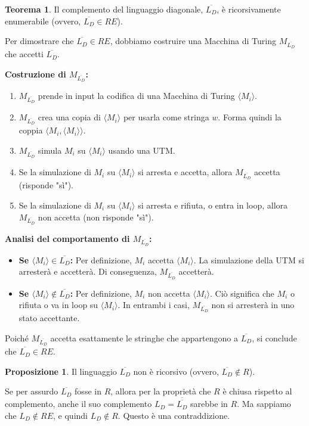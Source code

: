 \documentclass[a4paper]{article}
\makeatletter
\theoremstyle{definition} %
\newtheorem{theorem}{Teorema}
[section] %
\newtheorem{proposition}{Proposizione}[section]
\renewenvironment{proof}[1][\proofname]{\par
  \pushQED{\qed}%
  \normalfont \topsep6\p@\@plus6\p@\relax
  \trivlist
  \item[\hskip\labelsep
        \bfseries
    #1\@addpunct{.}]\ignorespaces
}{%
  \popQED\endtrivlist\@endpefalse
}
\makeatother
\begin{document}
\begin{theorem}
Il complemento del linguaggio diagonale, $\overline{L_D}$, è ricorsivamente enumerabile (ovvero, $\overline{L_D} \in RE$).
\end{theorem}
\begin{proof}
Per dimostrare che $\overline{L_D} \in RE$, dobbiamo costruire una Macchina di Turing $M_{\overline{L_D}}$ che accetti $\overline{L_D}$.

\textbf{Costruzione di $M_{\overline{L_D}}$:}
\begin{enumerate}
    \item $M_{\overline{L_D}}$ prende in input la codifica di una Macchina di Turing $\langle M_i \rangle$.
    \item $M_{\overline{L_D}}$ crea una copia di $\langle M_i \rangle$ per usarla come stringa $w$. Forma quindi la coppia $\langle M_i, \langle M_i \rangle \rangle$.
    \item $M_{\overline{L_D}}$ simula $M_i$ su $\langle M_i \rangle$ usando una UTM.
    \item Se la simulazione di $M_i$ su $\langle M_i \rangle$ si arresta e accetta, allora $M_{\overline{L_D}}$ accetta (risponde "sì").
    \item Se la simulazione di $M_i$ su $\langle M_i \rangle$ si arresta e rifiuta, o entra in loop, allora $M_{\overline{L_D}}$ non accetta (non risponde "sì").
\end{enumerate}
\textbf{Analisi del comportamento di $M_{\overline{L_D}}$:}
\begin{itemize}
    \item \textbf{Se $\langle M_i \rangle \in \overline{L_D}$:}
    Per definizione, $M_i$ accetta $\langle M_i \rangle$. La simulazione della UTM si arresterà e accetterà. Di conseguenza, $M_{\overline{L_D}}$ accetterà.
    \item \textbf{Se $\langle M_i \rangle \notin \overline{L_D}$:}
    Per definizione, $M_i$ non accetta $\langle M_i \rangle$. Ciò significa che $M_i$ o rifiuta o va in loop su $\langle M_i \rangle$. In entrambi i casi, $M_{\overline{L_D}}$ non si arresterà in uno stato accettante.
\end{itemize}
Poiché $M_{\overline{L_D}}$ accetta esattamente le stringhe che appartengono a $\overline{L_D}$, si conclude che $\overline{L_D} \in RE$.
\end{proof}

\begin{proposition}
Il linguaggio $\overline{L_D}$ non è ricorsivo (ovvero, $\overline{L_D} \notin R$).
\end{proposition}
\begin{proof}
Se per assurdo $\overline{L_D}$ fosse in $R$, allora per la proprietà che $R$ è chiusa rispetto al complemento, anche il suo complemento $L_D = \overline{\overline{L_D}}$ sarebbe in $R$. Ma sappiamo che $L_D \notin RE$, e quindi $L_D \notin R$. Questo è una contraddizione.
\end{proof}
\end{document}
